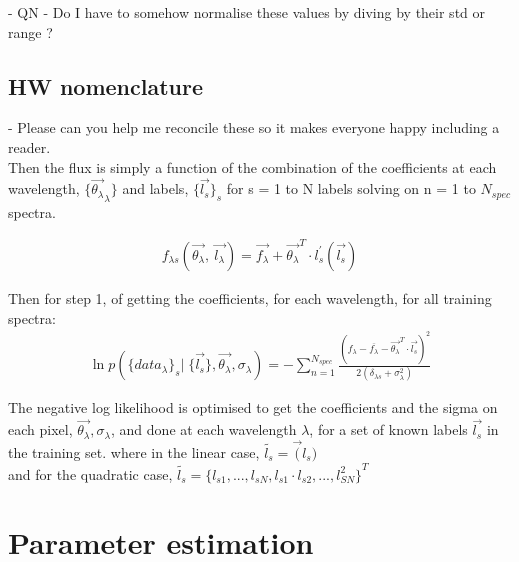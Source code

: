 \documentclass[12pt, preprint]{aastex}
\newcommand{\mean}[1]{\overline{#1}}
\begin{document}
- QN  - Do I have to somehow normalise these values by diving by their std or range ? 

\subsection{HW nomenclature}

- Please can you help me reconcile these so it makes everyone happy including a reader. \\


Then the flux is simply a function of the combination of the coefficients at each wavelength, $\{ \vec{\theta_\lambda}_\lambda \}$ and labels, $\{ \vec{l_{s}} \}_s$ for s = 1 to N labels solving on n = 1 to $N_{spec}$ spectra. 

 \begin{eqnarray}
f_{\lambda s}(\vec{\theta_{\lambda}},  \: \vec{l_\lambda} ) = \vec{f_\lambda} + {\vec{\theta_\lambda}^T \cdot l_s^{'} ( \vec{l_s})}
\end{eqnarray}

Then for step 1, of getting the coefficients, for each wavelength, for all training spectra: \\

 \begin{eqnarray}
\ln p ( \{ data_\lambda \}_s | \; \{ \vec{l_s} \}, \vec{\theta_\lambda }, {\sigma_\lambda} )  = 
- \sum\limits_{n=1}^{N_{spec}}  \frac{(f_\lambda - \mean{f_\lambda} - \vec{\theta_\lambda }^T  \cdot \vec{l_s})^2} {2(\delta_{\lambda s} + \sigma_\lambda^{2})}
\end{eqnarray}

The negative log likelihood is optimised to get the coefficients and the sigma on each pixel, $\vec{\theta_\lambda}, \sigma_\lambda$, and done at each wavelength $\lambda$, for a set of known labels $\vec{l_s}$ in the training set. 
\noindent where in the linear case, $\tilde{l_s} = \vec(l_s)$ \\
and for the quadratic case,  $\tilde{l_s} = { \{l_{s1}, ... , l_{sN}, l_{s1} \cdot l_{s2} , ..., l_{SN}^2\}}^T $\\



\section{Parameter estimation}
\label{sec:paramestimate}
\end{document}

